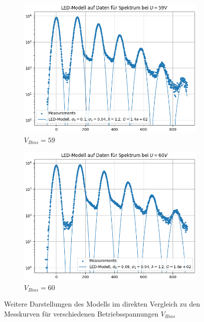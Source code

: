 \documentclass[12pt]{article}
\begin{document}
\begin{figure}[h!]
\begin{subfigure}{0.49\textwidth}
    \includegraphics[width=\textwidth]{Grafiken/modell 59}
    \caption{$V_{Bias}=59$}
  \end{subfigure}
  \begin{subfigure}{0.49\textwidth}
    \includegraphics[width=\textwidth]{Grafiken/modell 60}
    \caption{$V_{Bias}=60$}
  \end{subfigure}
  \caption{Weitere Darstellungen des Modells im direkten Vergleich zu den Messkurven für verschiedenen Betriebsspannungen $V_{Bias}$}
  \label{Modell2}
\end{figure}
\end{document}
